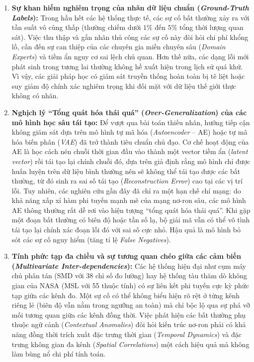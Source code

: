 \documentclass[11pt,journal,onecolumn]{IEEEtran}
\begin{document}
\begin{enumerate}
    \item \textbf{Sự khan hiếm nghiêm trọng của nhãn dữ liệu chuẩn (\textit{Ground-Truth Labels}):} 
    Trong hầu hết các hệ thống thực tế, các sự cố bất thường xảy ra với tần suất vô cùng thấp (thường chiếm dưới $1\%$ đến $5\%$ tổng thời lượng quan sát). Việc thu thập và gắn nhãn thủ công các sự cố này đòi hỏi chi phí khổng lồ, cần đến sự can thiệp của các chuyên gia miền chuyên sâu (\textit{Domain Experts}) và tiềm ẩn nguy cơ sai lệch chủ quan. Hơn thế nữa, các dạng lỗi mới phát sinh trong tương lai thường không hề xuất hiện trong lịch sử quá khứ. Vì vậy, các giải pháp học có giám sát truyền thống hoàn toàn bị tê liệt hoặc suy giảm độ chính xác nghiêm trọng khi đối mặt với dữ liệu thế giới thực không có nhãn.
    
    \item \textbf{Nghịch lý ``Tổng quát hóa thái quá'' (\textit{Over-Generalization}) của các mô hình học sâu tái tạo:} 
    Để vượt qua bài toán thiếu nhãn, hướng tiếp cận không giám sát dựa trên mô hình tự mã hóa (\textit{Autoencoder} -- AE) hoặc tự mã hóa biến phân (\textit{VAE}) đã trở thành tiêu chuẩn chủ đạo. Cơ chế hoạt động của AE là học cách nén chuỗi thời gian đầu vào thành một vector tiềm ẩn (\textit{latent vector}) rồi tái tạo lại chính chuỗi đó, dựa trên giả định rằng mô hình chỉ được huấn luyện trên dữ liệu bình thường nên sẽ không thể tái tạo được các bất thường, từ đó sinh ra sai số tái tạo (\textit{Reconstruction Error}) cao tại các vị trí lỗi. Tuy nhiên, các nghiên cứu gần đây đã chỉ ra một hạn chế chí mạng: do khả năng xấp xỉ hàm phi tuyến mạnh mẽ của mạng nơ-ron sâu, các mô hình AE thông thường rất dễ rơi vào hiện tượng ``tổng quát hóa thái quá''. Khi gặp một đoạn bất thường có biên độ hoặc tần số lạ, bộ giải mã vẫn có thể vô tình tái tạo lại chính xác đoạn lỗi đó với sai số cực nhỏ. Hậu quả là mô hình bỏ sót các sự cố nguy hiểm (tăng tỉ lệ \textit{False Negatives}).
    
    \item \textbf{Tính phức tạp đa chiều và sự tương quan chéo giữa các cảm biến (\textit{Multivariate Inter-dependencies}):} 
    Các hệ thống hiện đại như cụm máy chủ phân tán (SMD với 38 chỉ số đo lường) hay hệ thống tàu thăm dò không gian của NASA (MSL với 55 thuộc tính) có sự liên kết phi tuyến cực kỳ phức tạp giữa các kênh đo. Một sự cố có thể không biểu hiện rõ rệt ở từng kênh riêng lẻ (biên độ vẫn nằm trong ngưỡng an toàn) mà chỉ bộc lộ qua sự phá vỡ mối tương quan giữa các kênh đồng thời. Việc phát hiện các bất thường phụ thuộc ngữ cảnh (\textit{Contextual Anomalies}) đòi hỏi kiến trúc nơ-ron phải có khả năng đồng thời trích xuất đặc trưng thời gian (\textit{Temporal Dynamics}) và đặc trưng không gian đa kênh (\textit{Spatial Correlations}) một cách hiệu quả mà không làm bùng nổ chi phí tính toán.
\end{enumerate}
\end{document}

